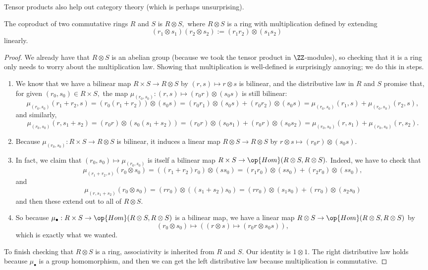 Tensor products also help out category theory (which is perhaps unsurprising).
\begin{proposition}
	The coproduct of two commutative rings $R$ and $S$ is $R\otimes S,$ where $R\otimes S$ is a ring with multiplication defined by extending
	\[(r_1\otimes s_1)(r_2\otimes s_2):=(r_1r_2)\otimes(s_1s_2)\]
	linearly.
\end{proposition}
\begin{proof}
	We already have that $R\otimes S$ is an abelian group (because we took the tensor product in $\ZZ$-modules), so checking that it is a ring only needs to worry about the multiplication law. Showing that multiplication is well-defined is surprisingly annoying; we do this in steps.
	\begin{enumerate}[label=(\roman*)]
		\item We know that we have a bilinear map $R\times S\to R\otimes S$ by $(r,s)\mapsto r\otimes s$ is bilinear, and the distributive law in $R$ and $S$ promise that, for given $(r_0,s_0)\in R\times S,$ the map $\mu_{(r_0,s_0)}:(r,s)\mapsto(r_0r)\otimes(s_0s)$ is still bilinear:
		\[\mu_{(r_0,s_0)}(r_1+r_2,s)=(r_0(r_1+r_2))\otimes(s_0s)=(r_0r_1)\otimes(s_0s)+(r_0r_2)\otimes(s_0s)=\mu_{(r_0,s_0)}(r_1,s)+\mu_{(r_0,s_0)}(r_2,s),\]
		and similarly,
		\[\mu_{(r_0,s_0)}(r,s_1+s_2)=(r_0r)\otimes(s_0(s_1+s_2))=(r_0r)\otimes(s_0s_1)+(r_0r)\otimes(s_0s_2)=\mu_{(r_0,s_0)}(r,s_1)+\mu_{(r_0,s_0)}(r,s_2).\]
		\item Because $\mu_{(r_0,s_0)}:R\times S\to R\otimes S$ is bilinear, it induces a linear map $R\otimes S\to R\otimes S$ by $r\otimes s\mapsto(r_0r)\otimes(s_0s).$
		\item In fact, we claim that $(r_0,s_0)\mapsto\mu_{(r_0,s_0)}$ is itself a bilinear map $R\times S\to\op{Hom}(R\otimes S,R\otimes S).$ Indeed, we have to check that
		\[\mu_{(r_1+r_2,s)}(r_0\otimes s_0)=((r_1+r_2)r_0)\otimes (ss_0)=(r_1r_0)\otimes(ss_0)+(r_2r_0)\otimes(ss_0),\]
		and
		\[\mu_{(r,s_1+s_2)}(r_0\otimes s_0)=(rr_0)\otimes ((s_1+s_2)s_0)=(rr_0)\otimes(s_1s_0)+(rr_0)\otimes(s_2s_0)\]
		and then these extend out to all of $R\otimes S.$
		\item So because $\mu_\bullet:R\times S\to\op{Hom}(R\otimes S,R\otimes S)$ is a bilinear map, we have a linear map $R\otimes S\to\op{Hom}(R\otimes S,R\otimes S)$ by
		\[(r_0\otimes s_0)\mapsto((r\otimes s)\mapsto(r_0r\otimes s_0s)),\]
		which is exactly what we wanted.
	\end{enumerate}
	To finish checking that $R\otimes S$ is a ring, associativity is inherited from $R$ and $S.$ Our identity is $1\otimes 1.$ The right distributive law holds because $\mu_\bullet$ is a group homomorphism, and then we can get the left distributive law because multiplication is commutative.
	

\end{proof}
